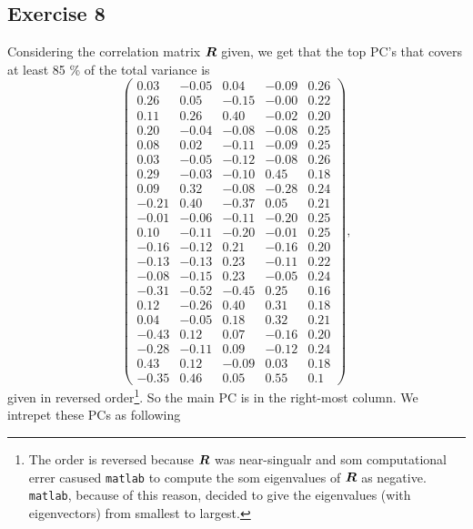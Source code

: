 
\subsection*{Exercise 8}
\label{sec:exercise-8}

Considering the correlation matrix $\bm{R}$ given, we get that the top
PC's that covers at least 85 \% of the total variance is 
\begin{equation*}
  \begin{pmatrix}
    0.03 &-0.05 &0.04 &-0.09 &0.26 \\ 
    0.26 &0.05 &-0.15 &-0.00 &0.22 \\ 
    0.11 &0.26 &0.40 &-0.02 &0.20 \\ 
    0.20 &-0.04 &-0.08 &-0.08 &0.25 \\ 
    0.08 &0.02 &-0.11 &-0.09 &0.25 \\ 
    0.03 &-0.05 &-0.12 &-0.08 &0.26 \\ 
    0.29 &-0.03 &-0.10 &0.45 &0.18 \\ 
    0.09 &0.32 &-0.08 &-0.28 &0.24 \\ 
    -0.21 &0.40 &-0.37 &0.05 &0.21 \\ 
    -0.01 &-0.06 &-0.11 &-0.20 &0.25 \\ 
    0.10 &-0.11 &-0.20 &-0.01 &0.25 \\ 
    -0.16 &-0.12 &0.21 &-0.16 &0.20 \\ 
    -0.13 &-0.13 &0.23 &-0.11 &0.22 \\ 
    -0.08 &-0.15 &0.23 &-0.05 &0.24 \\ 
    -0.31 &-0.52 &-0.45 &0.25 &0.16 \\ 
    0.12 &-0.26 &0.40 &0.31 &0.18 \\ 
    0.04 &-0.05 &0.18 &0.32 &0.21 \\ 
    -0.43 &0.12 &0.07 &-0.16 &0.20 \\ 
    -0.28 &-0.11 &0.09 &-0.12 &0.24 \\ 
    0.43 &0.12 &-0.09 &0.03 &0.18 \\ 
    -0.35 &0.46 &0.05 &0.55 &0.1
  \end{pmatrix},
\end{equation*}
given in reversed order\footnote{The order is reversed because $\bm{R}$
  was near-singualr and som computational errer casused \texttt{matlab}
  to compute the som eigenvalues of $\bm{R}$ as negative. \texttt{matlab},
  because of this reason, decided to give the eigenvalues (with
  eigenvectors) from smallest to largest.}. So the main PC is in the
right-most column. We intrepet these PCs as following
